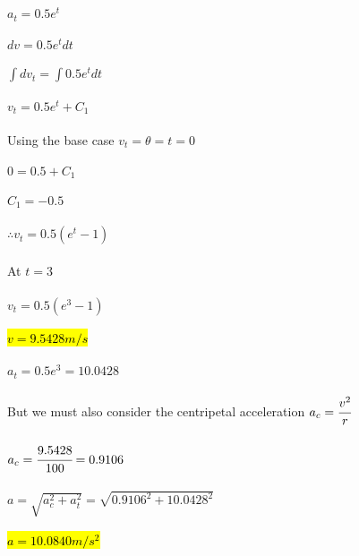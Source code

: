 \documentclass{article}
\begin{document}
\section{}
\subsection{}
$a_t = 0.5e^t$\\ \\
$dv = 0.5e^t dt$\\ \\
$\int dv_t = \int 0.5e^t dt$\\ \\
$v_t = 0.5e^t + C_1$\\ \\
Using the base case $v_t = \theta = t = 0$\\ \\
$0 = 0.5 + C_1$\\ \\
$C_1 = -0.5$\\ \\
$\therefore v_t = 0.5(e^t -1)$ \\ \\
At $t = 3$ \\ \\
$v_t = 0.5(e^3 - 1)$\\ \\
\hl{$v = 9.5428 m/s$}\\ \\
$a_t = 0.5e^3 = 10.0428$\\ \\
But we must also consider the centripetal acceleration $a_c = \cfrac{v^2}{r}$ \\ \\
$a_c = \cfrac{9.5428}{100} = 0.9106$\\ \\
$a = \sqrt{a_c^2 + a_t^2}= \sqrt{0.9106^2 + 10.0428^2}$\\ \\
\hl{$a = 10.0840 m/s^2$}
\end{document}
